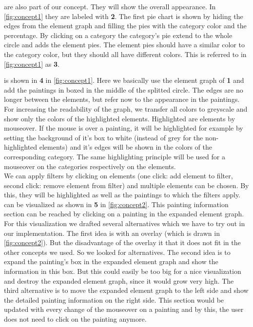 \documentclass[a4paper]{tufte-book}
\begin{document}
 are also part of our concept. They will show the overall appearance. In \ref{fig:concept1} they are labeled with \textbf{2}. The first pie chart is shown by hiding the edges from the element graph and filling the pies with the category color and the percentage. By clicking on a category the category's pie extend to the whole circle and adds the element pies. The element pies should have a similar color to the category color, but they should all have different colors. This is referred to in \ref{fig:concept1} as \textbf{3}.

 is shown in \textbf{4} in \ref{fig:concept1}. Here we basically use the element graph of \textbf{1} and add the paintings in boxed in the middle of the splitted circle. The edges are no longer between the elements, but refer now to the appearance in the paintings. For increasing the readability of the graph, we transfer all colors to greyscale and show only the colors of the highlighted elements. Highlighted are elements by mouseover. If the mouse is over a painting, it will be highlighted for example by setting the background of it's box to white (instead of grey for the non-highlighted elements) and it's edges will be shown in the colors of the corresponding category. The same highlighting principle will be used for a mouseover on the categories respectively on the elements.\\
We can apply filters by clicking on elements (one click: add element to filter, second click: remove element from filter) and multiple elements can be chosen. By this, they will be highlighted as well as the paintings to which the filters apply.  \\

 can be visualized as shown in \textbf{5} in \ref{fig:concept2}. This painting information section can be reached by clicking on a painting in the expanded element graph. For this visualization we drafted several alternatives which we have to try out in our implementation. The first idea is with an overlay (which is drawn in \ref{fig:concept2}). But the disadvantage of the overlay it that it does not fit in the other concepts we used. So we looked for alternatives. The second idea is to expand the painting's box in the expanded element graph and show the information in this box. But this could easily be too big for a nice visualization and destroy the expanded element graph, since it would grow very high. The third alternative is to move the expanded element graph to the left side and show the detailed painting information on the right side. This section would be updated with every change of the mouseover on a painting and by this, the user does not need to click on the painting anymore. \\
\end{document}
